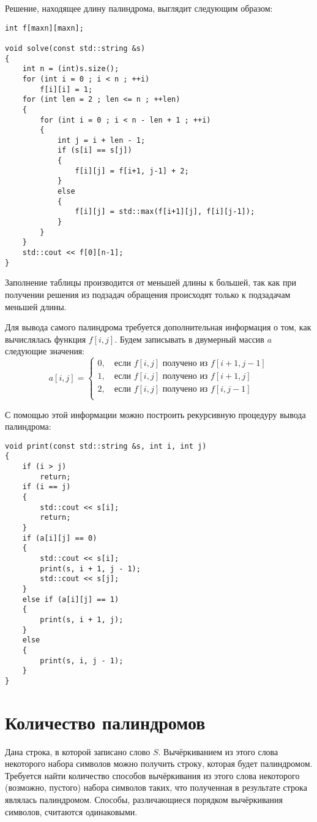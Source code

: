 \documentclass[14pt,openany]{book}
\begin{document}
Решение, находящее длину палиндрома, выглядит следующим образом:

\begin{lstlisting}
int f[maxn][maxn];

void solve(const std::string &s)
{
    int n = (int)s.size();
    for (int i = 0 ; i < n ; ++i)
        f[i][i] = 1;
    for (int len = 2 ; len <= n ; ++len)
    {
        for (int i = 0 ; i < n - len + 1 ; ++i)
        {
            int j = i + len - 1;
            if (s[i] == s[j])
            {
                f[i][j] = f[i+1, j-1] + 2;
            }
            else
            {
                f[i][j] = std::max(f[i+1][j], f[i][j-1]);
            }
        }
    }
    std::cout << f[0][n-1];
}
\end{lstlisting}

Заполнение таблицы производится от меньшей длины к большей, так как
при получении решения из подзадач обращения происходят только к подзадачам
меньшей длины.

Для вывода самого палиндрома требуется дополнительная информация о том, как
вычислялась функция $f[i,j]$. Будем записывать в двумерный массив $a$ следующие
значения:
$$
  a[i,j] = \left\{\begin{array}{l}
      0, \quad \text{если $f[i,j]$ получено из $f[i+1,j-1]$} \\
      1, \quad \text{если $f[i,j]$ получено из $f[i+1,j]$} \\
      2, \quad \text{если $f[i,j]$ получено из $f[i,j-1]$} \\
  \end{array}\right.
$$

С помощью этой информации можно построить рекурсивную процедуру вывода
палиндрома:

\begin{lstlisting}
void print(const std::string &s, int i, int j)
{
    if (i > j)
        return;
    if (i == j)
    {
        std::cout << s[i];
        return;
    }
    if (a[i][j] == 0)
    {
        std::cout << s[i];
        print(s, i + 1, j - 1);
        std::cout << s[j];
    }
    else if (a[i][j] == 1)
    {
        print(s, i + 1, j);
    }
    else
    {
        print(s, i, j - 1);
    }
}
\end{lstlisting}

\section{Количество палиндромов}

Дана строка, в которой записано слово $S$. Вычёркиванием из этого слова некоторого набора
символов можно получить строку, которая будет палиндромом. Требуется найти
количество способов вычёркивания из этого слова некоторого (возможно,
пустого) набора символов таких, что полученная в результате строка являлась
палиндромом. Способы, различающиеся порядком вычёркивания символов,
считаются одинаковыми.
\end{document}
